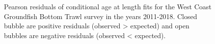 \documentclass[
]{scrartcl}
\begin{document}
\begin{figure}[H]


\caption{\label{fig-peasrson-resids-age-wcgbts2}Pearson residuals of
conditional age at length fits for the West Coast Groundfish Bottom
Trawl survey in the years 2011-2018. Closed bubble are positive
residuals (observed \textgreater{} expected) and open bubbles are
negative residuals (observed \textless{} expected).}

\end{figure}%
\end{document}
